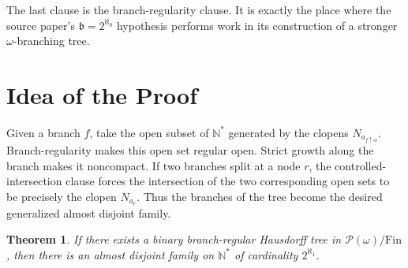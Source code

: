 \documentclass[11pt]{article}
\newtheorem{theorem}{Theorem}
\newcommand{\fin}{\mathrm{Fin}}
\newcommand{\restr}{\upharpoonright}
\begin{document}
The last clause is the branch-regularity clause. It is exactly the place where
the source paper's \(\mathfrak b=2^{\aleph_0}\) hypothesis performs work in
its construction of a stronger \(\omega\)-branching tree.

\section*{Idea of the Proof}

Given a branch \(f\), take the open subset of \(\mathbb N^*\) generated by the
clopens \(N_{a_{f\restr\alpha}}\). Branch-regularity makes this open set
regular open. Strict growth along the branch makes it noncompact. If two
branches split at a node \(r\), the controlled-intersection clause forces the
intersection of the two corresponding open sets to be precisely the clopen
\(N_{a_r}\). Thus the branches of the tree become the desired generalized
almost disjoint family.

\begin{theorem}
If there exists a binary branch-regular Hausdorff tree in
\(\mathcal P(\omega)/\fin\), then there is an almost disjoint family on
\(\mathbb N^*\) of cardinality \(2^{\aleph_1}\).
\end{theorem}
\end{document}
